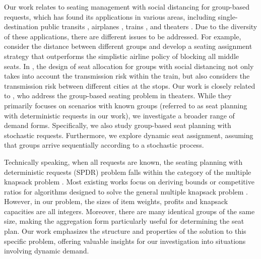 Our work relates to seating management with social distancing for group-based requests, which has found its applications in various areas, including single-destination public transits \citep{moore2021seat}, airplanes \citep{ghorbani2020model, salari2022social}, trains \citep{haque2022optimization, haque2023social}, and theaters \citep{blom2022filling}. Due to the diversity of these applications, there are different issues to be addressed. For example, \citet{salari2022social} consider the distance between different groups and develop a seating assignment strategy that outperforms the simplistic airline policy of blocking all middle seats. In \citet{haque2023social}, the design of seat allocation for groups with social distancing not only takes into account the transmission risk within the train, but also considers the transmission risk between different cities at the stops. Our work is closely related to \citet{blom2022filling}, who address the group-based seating problem in theaters. While they primarily focuses on scenarios with known groups (referred to as seat planning with deterministic requests in our work), we investigate a broader range of demand forms. Specifically, we also study group-based seat planning with stochastic requests. Furthermore, we explore dynamic seat assignment, assuming that groups arrive sequentially according to a stochastic process.


Technically speaking, when all requests are known, the seating planning with deterministic requests (SPDR) problem falls within the category of the multiple knapsack problem \citep{martello1990knapsack}. Most existing works focus on deriving bounds or competitive ratios for algorithms designed to solve the general multiple knapsack problem \citep{khuri1994zero, ferreira1996solving, pisinger1999exact, chekuri2005polynomial}. However, in our problem, the sizes of item weights, profits and knapsack capacities are all integers. Moreover, there are many identical groups of the same size, making the aggregation form particularly useful for determining the seat plan. Our work emphasizes the structure and properties of the solution to this specific problem, offering valuable insights for our investigation into situations involving dynamic demand.


